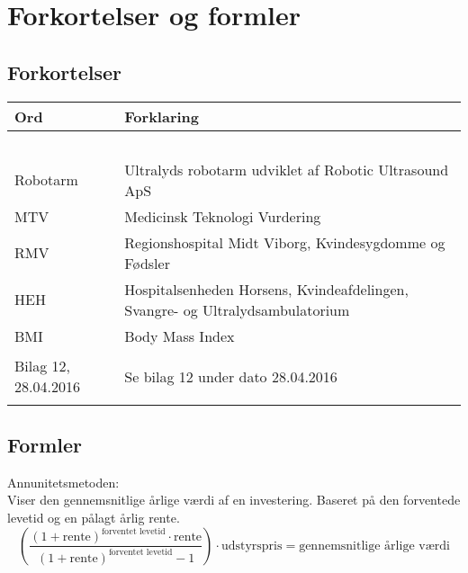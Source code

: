 \chapter{Forkortelser og formler}

\section{Forkortelser}
\begin{longtabu} to 
    Ord &    Forklaring\\
    \toprule\ \\
    Robotarm & Ultralyds robotarm udviklet af Robotic Ultrasound ApS \\
    MTV & Medicinsk Teknologi Vurdering \\
  	RMV & Regionshospital Midt Viborg, Kvindesygdomme og Fødsler \\
  	HEH & Hospitalsenheden Horsens, Kvindeafdelingen, Svangre- og Ultralydsambulatorium \\
  	BMI & Body Mass Index \\
  	Bilag 12, 28.04.2016 & Se bilag 12 under dato 28.04.2016
   
\label{forkort}
\end{longtabu}

\section{Formler} \label{Formler}
Annunitetsmetoden: \\
Viser den gennemsnitlige årlige værdi af en investering. Baseret på den forventede levetid og en pålagt årlig rente.
\begin{equation}
\left( \dfrac{(1+\text{rente})^{\text{forventet levetid}}\cdot \text{rente}}{(1+\text{rente})^{\text{forventet levetid}}-1}\right)\cdot \text{udstyrspris} = \text{gennemsnitlige årlige værdi}
\end{equation}